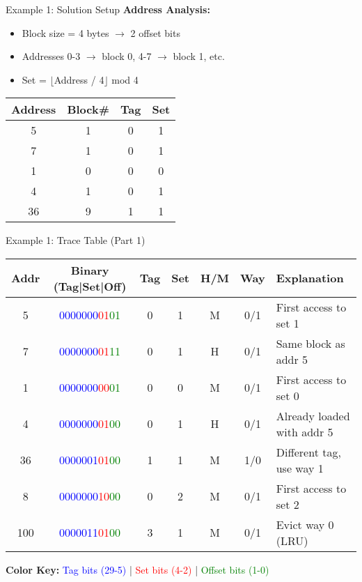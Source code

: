 \documentclass[aspectratio=169,12pt]{beamer}
\begin{document}
\begin{frame}{Example 1: Solution Setup}
\textbf{Address Analysis:}
\begin{itemize}
    \item Block size = 4 bytes $\rightarrow$ 2 offset bits
    \item Addresses 0-3 $\rightarrow$ block 0, 4-7 $\rightarrow$ block 1, etc.
    \item Set = $\lfloor$Address / 4$\rfloor$ mod 4
\end{itemize}

\begin{center}
\begin{tabular}{|c|c|c|c|}
\hline
\textbf{Address} & \textbf{Block\#} & \textbf{Tag} & \textbf{Set} \\
\hline
5 & 1 & 0 & 1 \\
7 & 1 & 0 & 1 \\
1 & 0 & 0 & 0 \\
4 & 1 & 0 & 1 \\
36 & 9 & 1 & 1 \\
\hline
\end{tabular}
\end{center}
\end{frame}

\begin{frame}{Example 1: Trace Table (Part 1)}
\begin{center}
\footnotesize
\begin{tabular}{|c|c|c|c|c|c|l|}
\hline
\textbf{Addr} & \textbf{Binary (Tag|Set|Off)} & \textbf{Tag} & \textbf{Set} & \textbf{H/M} & \textbf{Way} & \textbf{Explanation} \\
\hline
5 & \textcolor{blue}{0000000}\textcolor{red}{01}\textcolor{green}{01} & 0 & 1 & M & 0/1 & First access to set 1 \\
7 & \textcolor{blue}{0000000}\textcolor{red}{01}\textcolor{green}{11} & 0 & 1 & H & 0/1 & Same block as addr 5 \\
1 & \textcolor{blue}{0000000}\textcolor{red}{00}\textcolor{green}{01} & 0 & 0 & M & 0/1 & First access to set 0 \\
4 & \textcolor{blue}{0000000}\textcolor{red}{01}\textcolor{green}{00} & 0 & 1 & H & 0/1 & Already loaded with addr 5 \\
36 & \textcolor{blue}{0000001}\textcolor{red}{01}\textcolor{green}{00} & 1 & 1 & M & 1/0 & Different tag, use way 1 \\
8 & \textcolor{blue}{0000000}\textcolor{red}{10}\textcolor{green}{00} & 0 & 2 & M & 0/1 & First access to set 2 \\
100 & \textcolor{blue}{0000011}\textcolor{red}{01}\textcolor{green}{00} & 3 & 1 & M & 0/1 & Evict way 0 (LRU) \\
\hline
\end{tabular}
\end{center}
\vspace{0.2cm}
\textbf{Color Key:} \textcolor{blue}{Tag bits (29-5)} | \textcolor{red}{Set bits (4-2)} | \textcolor{green}{Offset bits (1-0)}
\end{frame}
\end{document}
